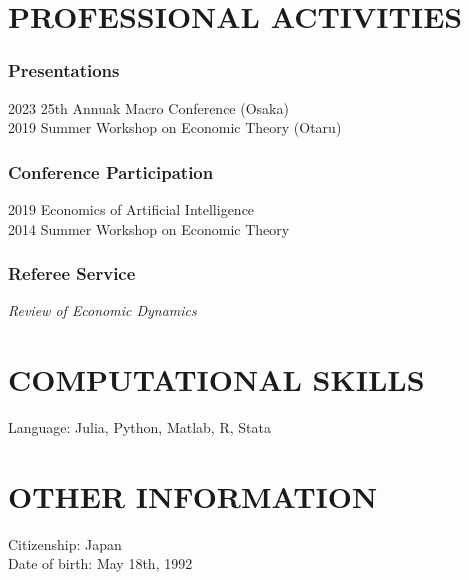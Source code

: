 \documentclass[12pt]{article}
\begin{document}
\section*{PROFESSIONAL ACTIVITIES}
\subsubsection*{Presentations}
2023 25th Annuak Macro Conference (Osaka)\\
2019 Summer Workshop on Economic Theory (Otaru)
\subsubsection*{Conference Participation}
2019 Economics of Artificial Intelligence\\
2014 Summer Workshop on Economic Theory
\subsubsection*{Referee Service}
\textit{Review of Economic Dynamics}

\section*{COMPUTATIONAL SKILLS}
Language: Julia, Python, Matlab, R, Stata

\section*{OTHER INFORMATION}
Citizenship: Japan\\
Date of birth: May 18th, 1992
\end{document}
